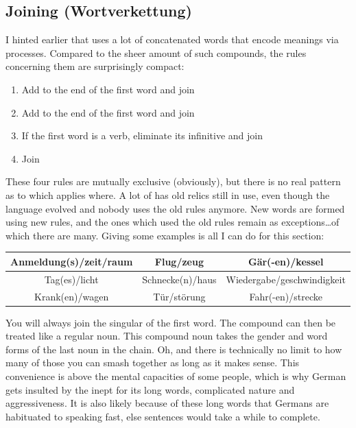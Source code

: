 \subsection[Joining]{Joining (Wortverkettung)}
I hinted earlier that  uses a lot of concatenated words that encode meanings via processes. Compared to the sheer amount of such compounds, the rules concerning them are surprisingly compact:
\begin{enumerate}
    \item Add  to the end of the first word and join
    \item Add  to the end of the first word and join
    \item If the first word is a verb, eliminate its infinitive  and join
    \item Join
\end{enumerate}
These four rules are mutually exclusive (obviously), but there is no real pattern as to which applies where. A lot of  has old relics still in use,  even though the language evolved and nobody uses the old rules anymore. New words are formed using new rules, and the ones which used the old rules remain as exceptions\ldots of which there are many. Giving some examples is all I can do for this section:
\begin{example}
    \begin{tabular}{c|c|c}
        Anmeldung(s)/zeit/raum & Flug/zeug & Gär(-en)/kessel\\\hline
        Tag(es)/licht & Schnecke(n)/haus & Wiedergabe/geschwindigkeit\\\hline
        Krank(en)/wagen & Tür/störung & Fahr(-en)/strecke
    \end{tabular}
\end{example}
You will always join the singular of the first word. The compound can then be treated like a regular noun. This compound noun takes the gender and word forms of the last noun in the chain. Oh, and there is technically no limit to how many of those you can smash together as long as it makes sense. This convenience is above the mental capacities of some people, which is why German gets insulted by the inept for its long words, complicated nature and aggressiveness. It is also likely because of these long words that Germans are habituated to speaking fast, else sentences would take a while to complete.

